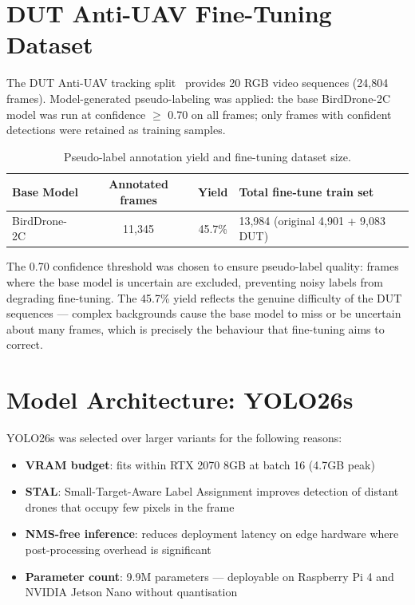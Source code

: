 \documentclass[12pt,a4paper]{report}
\begin{document}
\section{DUT Anti-UAV Fine-Tuning Dataset}

The DUT Anti-UAV tracking split~\cite{dutantiuav2022} provides 20 RGB video
sequences (24,804 frames). Model-generated pseudo-labeling was applied:
the base BirdDrone-2C model was run at confidence $\geq$ 0.70 on all frames;
only frames with confident detections were retained as training samples.

\begin{table}[H]
\centering
\caption{Pseudo-label annotation yield and fine-tuning dataset size.}
\begin{tabular}{|l|c|c|p{5cm}|}
\hline
\textbf{Base Model} & \textbf{Annotated frames} & \textbf{Yield} & \textbf{Total fine-tune train set} \\
\hline
BirdDrone-2C & 11,345 & 45.7\% & 13,984 (original 4,901 + 9,083 DUT) \\
\hline
\end{tabular}
\end{table}

The 0.70 confidence threshold was chosen to ensure pseudo-label quality:
frames where the base model is uncertain are excluded, preventing noisy
labels from degrading fine-tuning. The 45.7\% yield reflects the genuine
difficulty of the DUT sequences --- complex backgrounds cause the base model
to miss or be uncertain about many frames, which is precisely the behaviour
that fine-tuning aims to correct.

\section{Model Architecture: YOLO26s}

YOLO26s was selected over larger variants for the following reasons:

\begin{itemize}
  \item \textbf{VRAM budget}: fits within RTX 2070 8GB at batch 16 (4.7GB peak)
  \item \textbf{STAL}: Small-Target-Aware Label Assignment improves detection
        of distant drones that occupy few pixels in the frame
  \item \textbf{NMS-free inference}: reduces deployment latency on edge hardware
        where post-processing overhead is significant
  \item \textbf{Parameter count}: 9.9M parameters --- deployable on Raspberry Pi 4
        and NVIDIA Jetson Nano without quantisation
\end{itemize}
\end{document}
